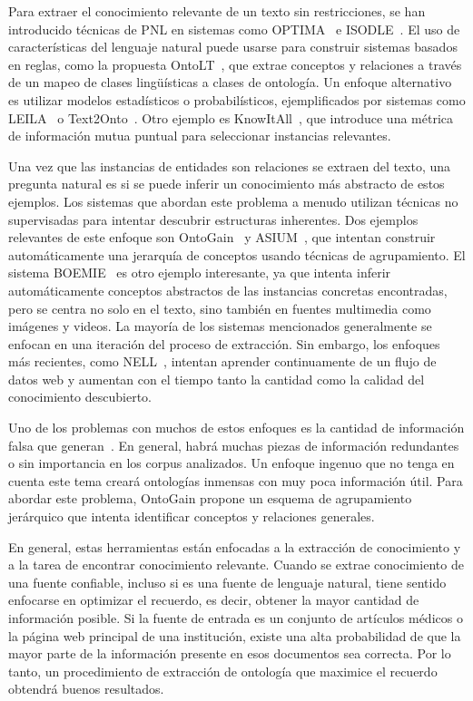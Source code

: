 Para extraer el conocimiento relevante de un texto sin restricciones, se han introducido técnicas de PNL en sistemas como OPTIMA~\cite{optima} e ISODLE~\cite{isolde}. El uso de características del lenguaje natural puede usarse para construir sistemas basados ​​en reglas, como la propuesta OntoLT~\cite{buitelaar2004ontolt}, que extrae conceptos y relaciones a través de un mapeo de clases lingüísticas a clases de ontología. Un enfoque alternativo es utilizar modelos estadísticos o probabilísticos, ejemplificados por sistemas como LEILA~\cite{leila} o Text2Onto~\cite{cimiano2005text2onto}. Otro ejemplo es KnowItAll~\cite{knowitall}, que introduce una métrica de información mutua puntual para seleccionar instancias relevantes.

Una vez que las instancias de entidades son relaciones se extraen del texto, una pregunta natural es si se puede inferir un conocimiento más abstracto de estos ejemplos. Los sistemas que abordan este problema a menudo utilizan técnicas no supervisadas para intentar descubrir estructuras inherentes. Dos ejemplos relevantes de este enfoque son OntoGain~\cite{drymonas2010unsupervised} y ASIUM~\cite{asium}, que intentan construir automáticamente una jerarquía de conceptos usando técnicas de agrupamiento. El sistema BOEMIE~\cite{boemie} es otro ejemplo interesante, ya que intenta inferir automáticamente conceptos abstractos de las instancias concretas encontradas, pero se centra no solo en el texto, sino también en fuentes multimedia como imágenes y videos. La mayoría de los sistemas mencionados generalmente se enfocan en una iteración del proceso de extracción. Sin embargo, los enfoques más recientes, como NELL~\cite{mitchell2015never}, intentan aprender continuamente de un flujo de datos web y aumentan con el tiempo tanto la cantidad como la calidad del conocimiento descubierto.

Uno de los problemas con muchos de estos enfoques es la cantidad de información falsa que generan~\cite{Maimon: 2015: OLT: 2870689.2870690}. En general, habrá muchas piezas de información redundantes o sin importancia en los corpus analizados. Un enfoque ingenuo que no tenga en cuenta este tema creará ontologías inmensas con muy poca información útil. Para abordar este problema, OntoGain propone un esquema de agrupamiento jerárquico que intenta identificar conceptos y relaciones generales.

En general, estas herramientas están enfocadas a la extracción de conocimiento y a la tarea de encontrar conocimiento relevante. Cuando se extrae conocimiento de una fuente confiable, incluso si es una fuente de lenguaje natural, tiene sentido enfocarse en optimizar el recuerdo, es decir, obtener la mayor cantidad de información posible. Si la fuente de entrada es un conjunto de artículos médicos o la página web principal de una institución, existe una alta probabilidad de que la mayor parte de la información presente en esos documentos sea correcta. Por lo tanto, un procedimiento de extracción de ontología que maximice el recuerdo obtendrá buenos resultados.

